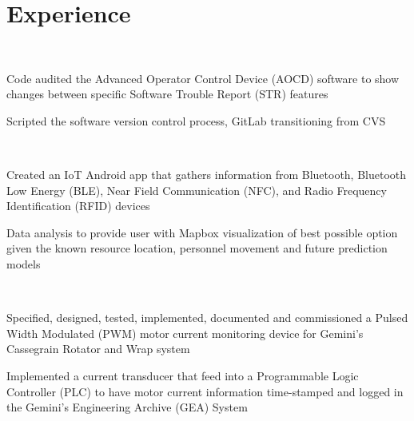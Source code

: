 \documentclass[]{hieudo-build}
\begin{document}
\begin{minipage}[t]{0.65\textwidth} 

\section{Experience}

\\
\vspace{0.9em} %
\begin{tightemize}
\small{}
\item Code audited the Advanced Operator Control Device (AOCD) software to show changes between specific Software Trouble Report (STR) features
\item Scripted the software version control process, GitLab transitioning from CVS 
\end{tightemize}
\sectionsep

 \\
\begin{tightemize}
\small{}
\item Created an IoT Android app that gathers information from 
    Bluetooth, Bluetooth Low Energy (BLE), Near Field Communication (NFC), and Radio Frequency Identification (RFID)
    devices
\item Data analysis to provide user with Mapbox visualization of best possible option given the known resource location, personnel movement and future prediction models
\end{tightemize}
\sectionsep

 \\
\begin{tightemize}
\small{}
\item Specified, designed, tested, implemented, documented and commissioned a Pulsed Width Modulated (PWM) motor current monitoring device for Gemini’s Cassegrain Rotator and Wrap system
\item Implemented a current transducer that feed into a Programmable Logic Controller (PLC) to have motor current information time-stamped and logged in the Gemini’s Engineering Archive (GEA) System
\end{tightemize}
\sectionsep


\end{minipage}
\end{document}
